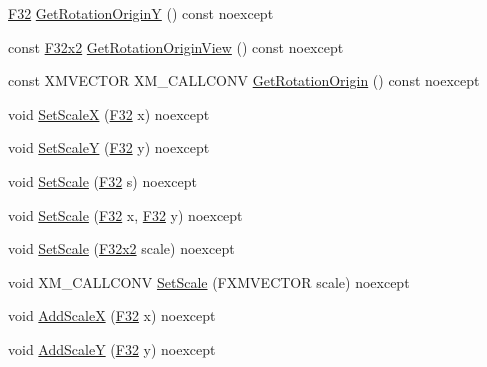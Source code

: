 \begin{DoxyCompactItemize}
\item 
\mbox{\hyperlink{namespacemage_aa97e833b45f06d60a0a9c4fc22ae02c0}{F32}} \mbox{\hyperlink{classmage_1_1_texture_transform2_d_ab58530d2cf002b6061e997fb7c577358}{Get\+Rotation\+OriginY}} () const noexcept
\item 
const \mbox{\hyperlink{namespacemage_aee4759dedc8def6c6dec26b5c7eddf29}{F32x2}} \mbox{\hyperlink{classmage_1_1_texture_transform2_d_a87d872e53687f91c9d281944799b5fc4}{Get\+Rotation\+Origin\+View}} () const noexcept
\item 
const X\+M\+V\+E\+C\+T\+OR X\+M\+\_\+\+C\+A\+L\+L\+C\+O\+NV \mbox{\hyperlink{classmage_1_1_texture_transform2_d_ab8724aa62179a1a4627d0ff0f9079be2}{Get\+Rotation\+Origin}} () const noexcept
\item 
void \mbox{\hyperlink{classmage_1_1_texture_transform2_d_ad4cdeb603456a824965f47184f41414d}{Set\+ScaleX}} (\mbox{\hyperlink{namespacemage_aa97e833b45f06d60a0a9c4fc22ae02c0}{F32}} x) noexcept
\item 
void \mbox{\hyperlink{classmage_1_1_texture_transform2_d_a622785c804ceb47b59a399ec495ad41d}{Set\+ScaleY}} (\mbox{\hyperlink{namespacemage_aa97e833b45f06d60a0a9c4fc22ae02c0}{F32}} y) noexcept
\item 
void \mbox{\hyperlink{classmage_1_1_texture_transform2_d_a41e8b0afcc90386e4445020ad1c19e4e}{Set\+Scale}} (\mbox{\hyperlink{namespacemage_aa97e833b45f06d60a0a9c4fc22ae02c0}{F32}} s) noexcept
\item 
void \mbox{\hyperlink{classmage_1_1_texture_transform2_d_a138d6c01fd2f00b8b59ec3dcb9ceef49}{Set\+Scale}} (\mbox{\hyperlink{namespacemage_aa97e833b45f06d60a0a9c4fc22ae02c0}{F32}} x, \mbox{\hyperlink{namespacemage_aa97e833b45f06d60a0a9c4fc22ae02c0}{F32}} y) noexcept
\item 
void \mbox{\hyperlink{classmage_1_1_texture_transform2_d_a7052159553ec45c745a8e77b1c07f2c4}{Set\+Scale}} (\mbox{\hyperlink{namespacemage_aee4759dedc8def6c6dec26b5c7eddf29}{F32x2}} scale) noexcept
\item 
void X\+M\+\_\+\+C\+A\+L\+L\+C\+O\+NV \mbox{\hyperlink{classmage_1_1_texture_transform2_d_a4e8cd3a12ef397aa166b2ed482c78d03}{Set\+Scale}} (F\+X\+M\+V\+E\+C\+T\+OR scale) noexcept
\item 
void \mbox{\hyperlink{classmage_1_1_texture_transform2_d_a463d665271a4f4ebf81b2771e79190fb}{Add\+ScaleX}} (\mbox{\hyperlink{namespacemage_aa97e833b45f06d60a0a9c4fc22ae02c0}{F32}} x) noexcept
\item 
void \mbox{\hyperlink{classmage_1_1_texture_transform2_d_a92c9e33b28679a8cc250a76a2c684e74}{Add\+ScaleY}} (\mbox{\hyperlink{namespacemage_aa97e833b45f06d60a0a9c4fc22ae02c0}{F32}} y) noexcept

\end{DoxyCompactItemize}
